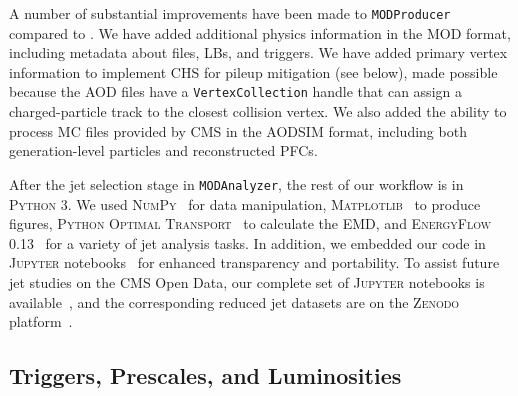 \documentclass[aps,prd,twocolumn,preprintnumbers,nofootinbib,longbibliography,floatfix,superscriptaddress]{revtex4-1}
\begin{document}
A number of substantial improvements have been made to \texttt{MODProducer} compared to .
%
We have added additional physics information in the MOD format, including metadata about files, LBs, and triggers.
%
We have added primary vertex information to implement CHS for pileup mitigation (see  below), made possible because the AOD files have a \texttt{VertexCollection} handle that can assign a charged-particle track to the closest collision vertex.
%
We also added the ability to process MC files provided by CMS in the AODSIM format, including both generation-level particles and reconstructed PFCs.


After the jet selection stage in \texttt{MODAnalyzer}, the rest of our workflow is in \textsc{Python} 3.
%
We used \textsc{NumPy}~\cite{NumPy} for data manipulation, \textsc{Matplotlib}~\cite{Matplotlib} to produce figures, \textsc{Python Optimal Transport}~\cite{flamary2017pot} to calculate the EMD, and \textsc{EnergyFlow} 0.13~\cite{EnergyFlow} for a variety of jet analysis tasks.
%
In addition, we embedded our code in \textsc{Jupyter} notebooks~\cite{Jupyter} for enhanced transparency and portability.
%
To assist future jet studies on the CMS Open Data, our complete set of \textsc{Jupyter} notebooks is available~\cite{MODRepo}, and the corresponding reduced jet datasets are on the \textsc{Zenodo} platform~\cite{MOD:ZenodoCMS,MOD:ZenodoMC170,MOD:ZenodoMC300,MOD:ZenodoMC470,MOD:ZenodoMC600,MOD:ZenodoMC800,MOD:ZenodoMC1000,MOD:ZenodoMC1400,MOD:ZenodoMC1800}.


\subsection{Triggers, Prescales, and Luminosities}
\label{subsec:trigger_and_lumi}
\end{document}
